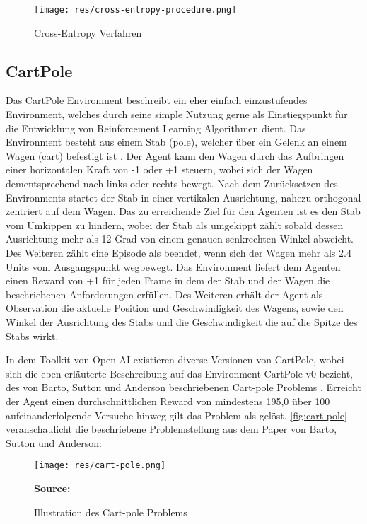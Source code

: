 \documentclass[11pt]{scrartcl}
\newcommand{\source}[1]{\vspace{-5pt} \caption*{\hfill \textbf{Source:} {#1}} }
\begin{document}
\begin{figure}[htp]
\centering
\texttt{[image: res/cross-entropy-procedure.png]}
\caption{Cross-Entropy Verfahren}
\label{fig:cross_entropy_procedure}
\end{figure}

\subsection{CartPole}
Das CartPole Environment beschreibt ein eher einfach einzustufendes Environment, welches durch seine
simple Nutzung gerne als Einstiegspunkt für die Entwicklung von Reinforcement Learning Algorithmen 
dient. Das Environment besteht aus einem Stab (pole), welcher über ein Gelenk an einem Wagen (cart) 
befestigt ist \cite{OAI2016_2}. Der Agent kann den Wagen durch das Aufbringen einer horizontalen Kraft 
von -1 oder +1 steuern, wobei sich der Wagen dementsprechend nach links oder rechts bewegt. Nach 
dem Zurücksetzen des Environments startet der Stab in einer vertikalen Ausrichtung, nahezu orthogonal
zentriert auf dem Wagen. Das zu erreichende Ziel für den Agenten ist es den Stab vom Umkippen zu hindern,
wobei der Stab als umgekippt zählt sobald dessen Ausrichtung mehr als 12 Grad von einem genauen
senkrechten Winkel abweicht. Des Weiteren zählt eine Episode als beendet, wenn sich der Wagen mehr
als 2.4 Units vom Ausgangspunkt wegbewegt. Das Environment liefert dem Agenten einen Reward von +1
für jeden Frame in dem der Stab und der Wagen die beschriebenen Anforderungen erfüllen. Des Weiteren
erhält der Agent als Observation die aktuelle Position und Geschwindigkeit des Wagens, sowie den Winkel
der Ausrichtung des Stabs und die Geschwindigkeit die auf die Spitze des Stabs wirkt.

In dem Toolkit von Open AI existieren diverse Versionen von CartPole, wobei sich die eben
erläuterte Beschreibung auf das Environment CartPole-v0 bezieht, des von Barto, Sutton und
Anderson beschriebenen Cart-pole Problems \cite[~S.838 f.]{BSA1983}. Erreicht der Agent einen
durchschnittlichen Reward von mindestens 195,0 über 100 aufeinanderfolgende Versuche hinweg gilt das
Problem als gelöst. \autoref{fig:cart-pole} veranschaulicht die beschriebene Problemstellung aus dem 
Paper\cite{BSA1983} von Barto, Sutton und Anderson:

\begin{figure}[htp]
\centering
\texttt{[image: res/cart-pole.png]}
\caption{Illustration des Cart-pole Problems}
\source{\cite[~S.838]{BSA1983}}
\label{fig:cart-pole}
\end{figure}
\end{document}
